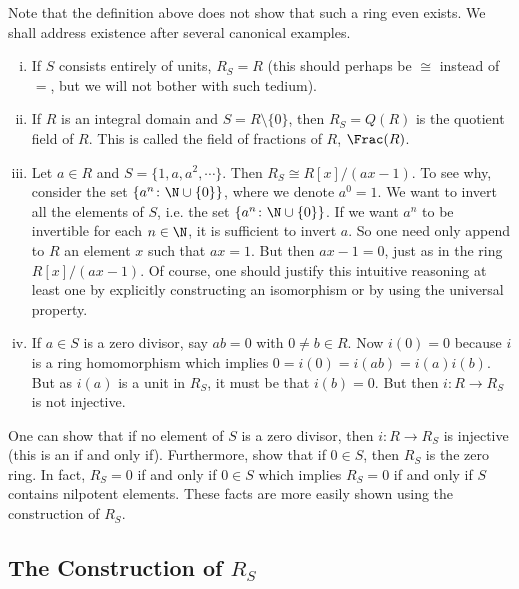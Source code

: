 Note that the definition above does not show that such a ring even exists. We shall address existence after several canonical examples. 


\begin{ex} \hfill
	\begin{enumerate}[(i)]
	\item If $S$ consists entirely of units, $R_S=R$ (this should perhaps be $\cong$ instead of $=$, but we will not bother with such tedium).
	\item If $R$ is an integral domain and $S=R \setminus \{0\}$, then $R_S=Q(R)$ is the quotient field of $R$. This is called the field of fractions of $R$, $\Frac(R)$.
	\item Let $a \in R$ and $S=\{1,a,a^2,\cdots\}$. Then $R_S \cong R[x]/(ax-1)$. To see why, consider the set $\{a^n \colon \N \cup \{0\}\}$, where we denote $a^0=1$. We want to invert all the elements of $S$, i.e. the set $\{a^n \colon \N \cup \{0\}\}$. If we want $a^n$ to be invertible for each $n \in \N$, it is sufficient to invert $a$. So one need only append to $R$ an element $x$ such that $ax=1$. But then $ax-1=0$, just as in the ring $R[x]/(ax-1)$. Of course, one should justify this intuitive reasoning at least one by explicitly constructing an isomorphism or by using the universal property.
	\item If $a \in S$ is a zero divisor, say $ab=0$ with $0 \neq b \in R$. Now $i(0)=0$ because $i$ is a ring homomorphism which implies $0=i(0)=i(ab)=i(a)i(b)$. But as $i(a)$ is a unit in $R_S$, it must be that $i(b)=0$. But then $i: R \rightarrow R_S$ is not injective. 
	\end{enumerate}
\end{ex}


One can show that if no element of $S$ is a zero divisor, then $i: R \to R_S$ is injective (this is an if and only if). Furthermore, show that if $0 \in S$, then $R_S$ is the zero ring. In fact, $R_S=0$ if and only if $0 \in S$ which implies $R_S=0$ if and only if $S$ contains nilpotent elements. These facts are more easily shown using the construction of $R_S$. 



\subsection{The Construction of $R_S$}



